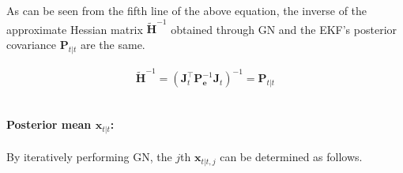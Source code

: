 \documentclass[10pt]{article}
\begin{document}
	
	
As can be seen from the fifth line of the above equation, the inverse of the approximate Hessian matrix $\tilde{\mathbf{H}}^{-1}$ obtained through GN and the EKF's posterior covariance $\mathbf{P}_{t|t}$ are the same.

\begin{equation}  
	\begin{aligned}
		\tilde{\mathbf{H}}^{-1} = (\mathbf{J}_{t}^{\intercal} \mathbf{P}_{\mathbf{e}}^{-1} \mathbf{J}_{t})^{-1} = \mathbf{P}_{t|t}
	\end{aligned} 
\end{equation}


~\\
\textbf{Posterior mean $\mathbf{x}_{t|t}$:}
~\\ \\
By iteratively performing GN, the $j$th $\mathbf{x}_{t|t, j}$ can be determined as follows. 
\end{document}
